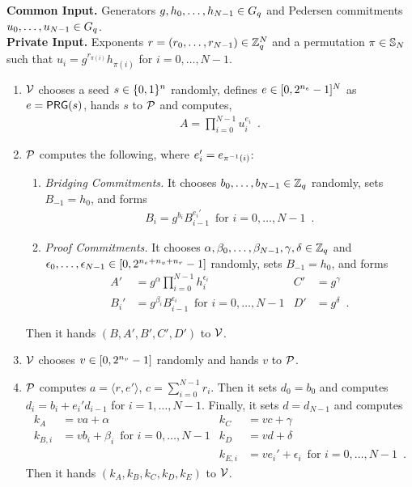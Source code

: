 \begin{nicebox}
\begin{protocol}$\quad$\label{prot:matrix}\\
  \textbf{Common Input.} Generators $g,h_0,\ldots,h_{N-1}\in\Gq$
  and
  Pedersen commitments $u_0,\ldots,u_{N-1}\in\Gq$.\\
  \textbf{Private Input.} Exponents $r=(r_0,\ldots,r_{N-1})\in\zedq^N$
  and a permutation $\pi\in\permset{N}$ such that
  $u_i=g^{r_{\pi(i)}}h_{\pi(i)}$ for $i=0,\ldots,N-1$.
  \begin{enumerate}

  \item $\V$ chooses a seed $s\in\{0,1\}^{\secp}$ randomly, defines
    $e\in\INT{\secpe}^N$ as $e=\PRG(s)$, hands $s$ to $\P$ and
    computes,
    \begin{align*}
      A=\prod\nolimits_{i=0}^{N-1}u_i^{e_i}\enspace .
    \end{align*}

  \item $\P$ computes the following, where $e_i'=e_{\ipi(i)}$:
    \begin{enumerate}
    \item \emph{Bridging Commitments.} It chooses
      $b_0,\ldots,b_{N-1}\in\zedq$ randomly, sets $B_{-1}=h_0$, and forms
    \begin{align*}
      B_i=g^{b_i}B_{i-1}^{e_i'}\enspace
      \text{for $i=0,\ldots,N-1$}\enspace.
    \end{align*}

  \item \emph{Proof Commitments.} It chooses
    $\alpha,\beta_0,\ldots,\beta_{N-1},\gamma,\delta\in\zedq$ and
    $\epsilon_0,\ldots,\epsilon_{N-1}\in\INT{\secpe+\secpv+\secpr}$
    randomly, sets $B_{-1}=h_0$, and forms
    \begin{align*}
      A'&=g^{\alpha}\prod\nolimits_{i=0}^{N-1}h_i^{\epsilon_i}
      &C'&=g^\gamma\\
      B_i'&=g^{\beta_i}B_{i-1}^{\epsilon_i}\enspace\text{for $i=0,\ldots,N-1$}
      &D'&=g^\delta\enspace.
    \end{align*}
    \end{enumerate}
    Then it hands $(B,A',B',C',D')$ to $\V$.

  \item $\V$ chooses $v\in\INT{\secpv}$ randomly and hands $v$ to $\P$.

  \item $\P$ computes $a=\langle r,e'\rangle$,
    $c=\sum_{i=0}^{N-1}r_i$. Then it sets $d_0=b_0$ and computes
    $d_i=b_i+e_i'd_{i-1}$ for $i=1,\ldots,N-1$. Finally, it sets
    $d=d_{N-1}$ and computes
    \begin{align*}
      k_A&=va+\alpha
      &k_C&=vc+\gamma \\
      k_{B,i}&=vb_i+\beta_i\enspace\text{for $i=0,\ldots,N-1$}
      &k_D&=vd+\delta\\
      &&k_{E,i}&=ve_i'+\epsilon_i\enspace\text{for $i=0,\ldots,N-1$}\enspace.
    \end{align*}
    Then it hands $(k_A,k_B,k_C,k_D,k_E)$ to $\V$.


\end{enumerate}
\end{protocol}
\end{nicebox}
